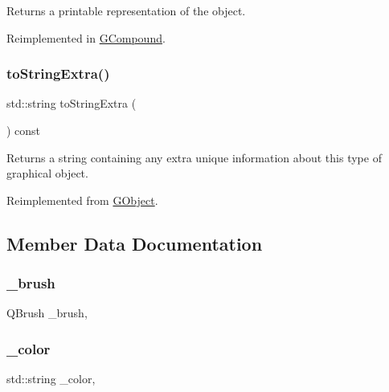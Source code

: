 Returns a printable representation of the object. 



Reimplemented in \mbox{\hyperlink{classGCompound_add86bda25fd0c3b8edaedee9431b85e6}{G\+Compound}}.

\mbox{\label{classGText_a85b5bcebac42ec5f130b0c3851383a23}} 
\subsubsection{\texorpdfstring{to\+String\+Extra()}{toStringExtra()}}
{\footnotesize\ttfamily std\+::string to\+String\+Extra (\begin{DoxyParamCaption}{ }\end{DoxyParamCaption}) const\hspace{0.3cm}{\ttfamily [virtual]}}



Returns a string containing any extra unique information about this type of graphical object. 



Reimplemented from \mbox{\hyperlink{classGObject_a4fcdf8de5c6de92242a975d83d8f23ea}{G\+Object}}.



\subsection{Member Data Documentation}
\mbox{\label{classGObject_aab24462ec896b596d99911767b0912d0}} 
\subsubsection{\texorpdfstring{\+\_\+brush}{\_brush}}
{\footnotesize\ttfamily Q\+Brush \+\_\+brush\hspace{0.3cm}{\ttfamily [protected]}, {\ttfamily [inherited]}}

\mbox{\label{classGObject_a1134e770ae4315ea8bc1201e2f21da8b}} 
\subsubsection{\texorpdfstring{\+\_\+color}{\_color}}
{\footnotesize\ttfamily std\+::string \+\_\+color\hspace{0.3cm}{\ttfamily [protected]}, {\ttfamily [inherited]}}

